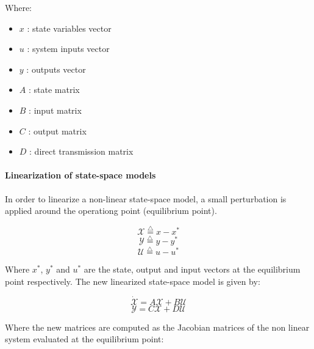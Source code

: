 Where:

\begin{itemize}
  \item $x$ : state variables vector
  \item $u$ : system inputs vector
  \item $y$ : outputs vector
  \item $A$ : state matrix
  \item $B$ : input matrix
  \item $C$ : output matrix
  \item $D$ : direct transmission matrix
\end{itemize}

\paragraph{Linearization of state-space models}


In order to linearize a non-linear state-space model, a small perturbation is applied around the operationg point (equilibrium point).

\begin{equation}
   \mathcal{X} \overset{\triangle}{=} x-x^*
\end{equation}
\begin{equation}
   \mathcal{Y} \overset{\triangle}{=} y-y^*
\end{equation}
\begin{equation}
   \mathcal{U} \overset{\triangle}{=} u-u^*
\end{equation}

Where $x^*$, $y^*$ and $u^*$ are the state, output and input vectors at the equilibrium point respectively. The new linearized state-space model is given by:

\vspace{2cm}

\begin{equation}
 \dot{\mathcal{X}} = A \mathcal{X} + B \mathcal{U}
\end{equation}
\begin{equation}
\mathcal{Y} = C \mathcal{X} + D \mathcal{U}
\end{equation}

Where the new matrices are computed as the Jacobian matrices of the non linear system evaluated at the equilibrium point:

